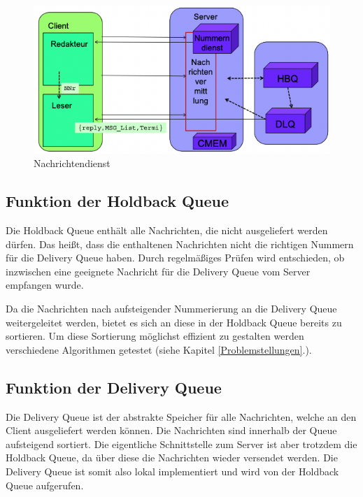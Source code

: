 \begin{figure}[htbp]
\begin{center}
\includegraphics[scale=0.6]{Bilder/NachrichtendienstAbb.png}
\caption{\label{fig:nachrichtendienst} Nachrichtendienst \cite{Klauck2021}} 
\end{center}
\end{figure}

\subsection{Funktion der Holdback Queue}

Die Holdback Queue enthält alle Nachrichten, die nicht ausgeliefert werden dürfen. Das heißt, dass die enthaltenen Nachrichten nicht die richtigen Nummern für die Delivery Queue haben. Durch regelmäßiges Prüfen wird entschieden, ob inzwischen eine geeignete Nachricht für die Delivery Queue vom Server empfangen wurde. 

Da die Nachrichten nach aufsteigender Nummerierung an die Delivery Queue weitergeleitet werden, bietet es sich an diese in der Holdback Queue bereits zu sortieren. 
Um diese Sortierung möglichst effizient zu gestalten werden verschiedene Algorithmen getestet (siehe Kapitel \ref{Problemstellungen}.).

\subsection{Funktion der Delivery Queue}

Die Delivery Queue ist der abstrakte Speicher für alle Nachrichten, welche an den Client ausgeliefert werden können. Die Nachrichten sind innerhalb der Queue aufsteigend sortiert. Die eigentliche Schnittstelle zum Server ist aber trotzdem die Holdback Queue, da über diese die Nachrichten wieder versendet werden. Die Delivery Queue ist somit also lokal implementiert und wird von der Holdback Queue aufgerufen. 


